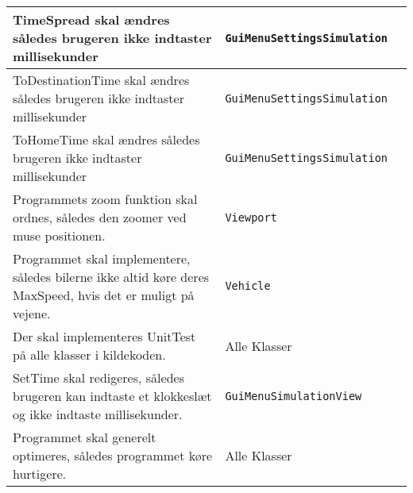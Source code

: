 \begin{table}[H]
\begin{tabular}{|l|l|l|}
TimeSpread skal ændres således brugeren ikke indtaster millisekunder                                        & \texttt{GuiMenuSettingsSimulation} &                                                                                                                                                                    \\ \hline
ToDestinationTime skal ændres således brugeren ikke indtaster millisekunder                                 & \texttt{GuiMenuSettingsSimulation} &                                                                                                                                                                    \\ \hline
ToHomeTime skal ændres således brugeren ikke indtaster millisekunder                                        & \texttt{GuiMenuSettingsSimulation} &                                                                                                                                                                    \\ \hline
Programmets zoom funktion skal ordnes, således den zoomer ved muse positionen.                              & \texttt{Viewport}                  &                                                                                                                                                                    \\ \hline
Programmet skal implementere, således bilerne ikke altid køre deres MaxSpeed, hvis det er muligt på vejene. & \texttt{Vehicle}                   &                                                                                                                                                                    \\ \hline
Der skal implementeres UnitTest på alle klasser i kildekoden.                                               & Alle Klasser                       &                                                                                                                                                                    \\ \hline
SetTime skal redigeres, således brugeren kan indtaste et klokkeslæt og ikke indtaste millisekunder.         & \texttt{GuiMenuSimulationView}     &                                                                                                                                                                    \\ \hline
Programmet skal generelt optimeres, således programmet køre hurtigere.                                      & Alle Klasser                       &                                                                                                                                                                    \\ \hline

\end{tabular}
\end{table}

